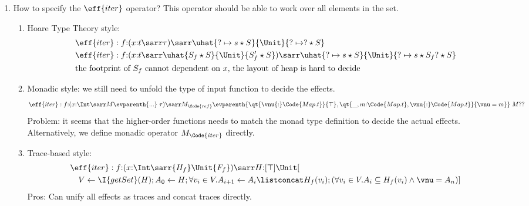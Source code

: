 \begin{example}[Iterators]
\begin{enumerate}
\begin{enumerate}
\begin{align*}
                &\qquad s{:}\ort{\Code{Set.t}}{P\;\vnu} \sarr (r{:}\tau, \urt{\Code{Set.t}}{Q\;r\;s\;\vnu})  \quad \text{(refinement type)} \\
                & \eff{insert}: x{:}\Int \sarr M_{\Code{set}}\evparenth{\qt{\vnu{:}\Code{Set.t}}{\top}, \qt{\_{:}\Unit,s{:}\Code{Set.t},\vnu{:}\Code{Set.t}}{\vnu = s \cup \{r\}}} \;\Unit
            \end{align*}\noindent
            \item Trace-based style:
            \begin{align*}
                & \eff{insert}: x{:}\Int \sarr H{:}\uhat{\top}{\Unit}{\vnu = H \listconcat \msgA{insert}{x}}
            \end{align*}\noindent
        \end{enumerate}
        \item How to specify the $\eff{iter}$ operator? This operator should be able to work over all elements in the set.
        \begin{enumerate}
            \item Hoare Type Theory style:
            \begin{align*}
                & \eff{iter}: f{:}(x{:}t \sarr \tau) \sarr \uhat{? \mapsto s \star S}{\Unit}{? \mapsto ? \star S} \\
                & \eff{iter}: f{:}(x{:}t \sarr \uhat{S_f \star S}{\Unit}{S_f' \star S}) \sarr \uhat{? \mapsto s \star S}{\Unit}{? \mapsto s \star S_f? \star S} \\
                & \text{the footprint of $S_f$ cannot dependent on $x$, the layout of heap is hard to decide}
            \end{align*}
            \item Monadic style:
             we still need to unfold the type of input function to decide the effects.
            \begin{align*}
                & \eff{iter}: f{:}(x{:}\Int\sarr M\evparenth{...}\; \tau) \sarr M_{\Code{ref}}\evparenth{\qt{\vnu{:}\Code{Map.t}}{\top}, \qt{\_,m{:}\Code{Map.t},\vnu{:}\Code{Map.t}}{\vnu = m}} \;M??
            \end{align*}
            Problem: it seems that the higher-order functions needs to match the monad type definition to decide the actual effects. Alternatively, we define monadic operator $M_\Code{iter}$ directly.
            \item Trace-based style:
            \begin{align*}
                & \eff{iter}: f{:} (x{:}\Int \sarr \{H_f\}\Unit\{F_f\}) \sarr H{:}[\top]{\Unit}[
                    \\&\quad  V \leftarrow \I{getSet}(H); A_0 \leftarrow H; \forall v_i \in V. A_{i{+}1} \leftarrow A_i \listconcat H_f(v_i); (\forall v_i \in V. A_i \subseteq H_f(v_i) \land \vnu = A_{n}) ]
            \end{align*}
            Pros: Can unify all effects as traces and concat traces directly.


\end{enumerate}
\end{enumerate}
\end{example}
